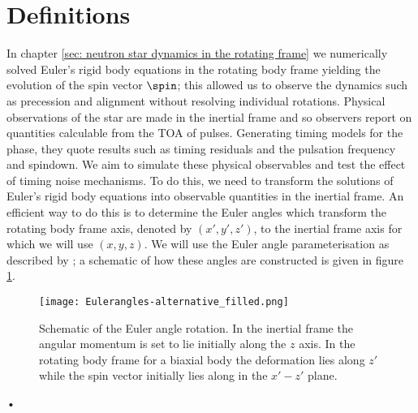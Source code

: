 \documentclass[/home/greg/Thesis/main/main.tex]{subfiles}
\begin{document}
\graphicspath{{/home/greg/Neutron_star_modelling/TimingNoiseModels/Observables_NoTorque/img/}}

\newcommand{\Jr}{\mathbf{J}_{\textrm{rot}}}
\newcommand{\Ji}{\mathbf{J}_{\textrm{in}}}

\section{Definitions}
In chapter \ref{sec: neutron star dynamics in the rotating frame} we
numerically solved Euler's rigid body equations in the rotating body frame
yielding the evolution of the spin vector $\spin$; this allowed us to observe
the dynamics such as precession and alignment without resolving individual
rotations. Physical observations of the star are made in the inertial frame and
so observers report on quantities calculable from the TOA of pulses. Generating
timing models for the phase, they quote results such as timing residuals and
the pulsation frequency and spindown. We aim to simulate these physical
observables and test the effect of timing noise mechanisms. To do
this, we need to transform the solutions of Euler's rigid body equations into
observable quantities in the inertial frame. An efficient way to do this is to
determine the Euler angles which transform the rotating body frame axis,
denoted by $(x',y', z')$, to the inertial frame axis for which we will use $(x,
y, z)$. We will use the Euler angle parameterisation as described by
\citet{Landau1969}; a schematic of how these angles are constructed is given in
figure \ref{fig: Euler}. 
\begin{figure}[ht]
\centering
\texttt{[image: Eulerangles-alternative\_filled.png]}
\caption{Schematic of the Euler angle rotation. In the inertial frame the
angular momentum is set to lie initially along the $z$ axis. In the rotating
body frame for a biaxial body the deformation lies along $z'$ while the spin
vector initially lies along in the $x'- z'$ plane.}
\label{fig: Euler}
\end{figure}•
\end{document}
